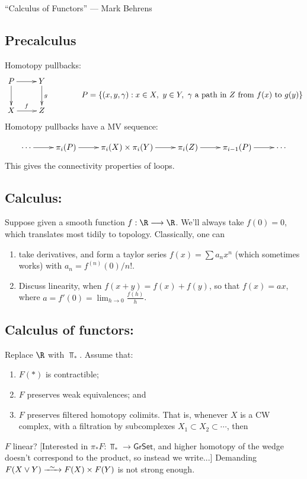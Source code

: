 \begin{BehrensGoodwillieCalcIntro}
\KanSemResponse
{``Calculus of Functors'' --- Mark Behrens}
\subsection*{Precalculus}
Homotopy pullbacks:
\[\xymatrix{
P\ar[r]\ar[d]&Y\ar[d]^g\\
X\ar[r]^f&Z
} \qquad \qquad \raisebox{-6mm}{$P=\left\{(x,y,\gamma):x\in X,\ y\in Y,\ \gamma\textup{ a path in $Z$ from $f(x)$ to $g(y)$}\right\}$}\]
Homotopy pullbacks have a MV sequence:

\[\xymatrix{\cdots\ar[r]&
\pi_i(P)\ar[r]&
\pi_i(X)\times\pi_i(Y)\ar[r]&
\pi_i(Z)\ar[r]&
\pi_{i-1}(P)\ar[r]&
\cdots}\]
This gives the connectivity properties of loops.
\subsection*{Calculus:}
Suppose given a smooth function $f:\R\to\R$. We'll always take $f(0)=0$, which translates most tidily to topology. Classically, one can
\begin{enumerate}\squishlist
\item take derivatives, and form a taylor series $f(x)=\sum a_nx^n$ (which sometimes works) with $a_n=f^{(n)}(0)/n!$.
\item Discuss linearity, when $f(x+y)=f(x)+f(y)$, so that $f(x)=ax$, where $a=f'(0)=\lim_{h\rightarrow0} \frac{f(h)}{h}$.
\end{enumerate}
\subsection*{Calculus of functors:}
Replace $\R$ with $\Top_*$. Assume that:
\begin{enumerate}\squishlist
\item $F(*)$ is contractible;
\item $F$ preserves weak equivalences; and
\item $F$ preserves filtered homotopy colimits. That is, whenever $X$ is a CW complex, with a filtration by subcomplexes $X_1\subset X_2\subset\cdots$, then  
\end{enumerate}
\begin{defn*}
$F$ linear? [Interested in $\pi_*F:\Top_*\to\mathsf{GrSet}$, and higher homotopy of the wedge doesn't correspond to the product, so instead we write...] Demanding $F(X\vee Y)\weakequiv F(X)\times F(Y)$ is not strong enough.


\end{defn*}
\end{BehrensGoodwillieCalcIntro}
